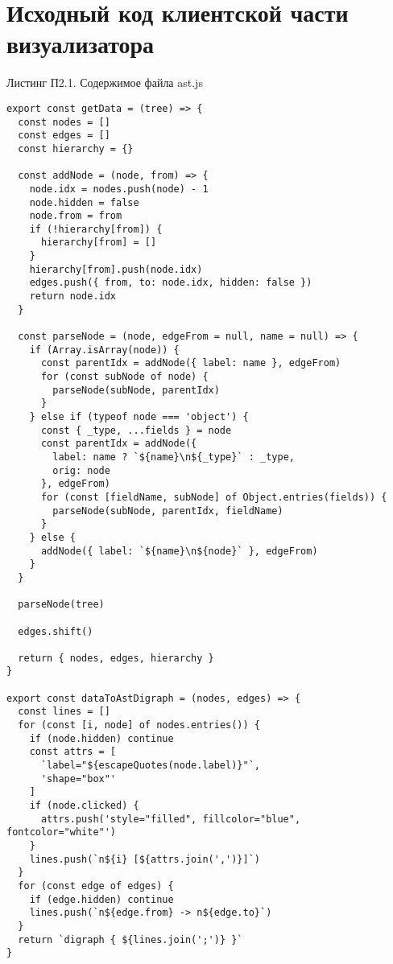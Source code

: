 \chapter{Исходный код клиентской части визуализатора}\label{appendix-MikTeX-TexStudio}							%

\lstset{
frame=single,
numbersep = 5pt,
stepnumber = 1
}

\begin{flushright}
Листинг П2.1. Содержимое файла ast.js
\end{flushright}

\begin{lstlisting}
export const getData = (tree) => {
  const nodes = []
  const edges = []
  const hierarchy = {}

  const addNode = (node, from) => {
    node.idx = nodes.push(node) - 1
    node.hidden = false
    node.from = from
    if (!hierarchy[from]) {
      hierarchy[from] = []
    }
    hierarchy[from].push(node.idx)
    edges.push({ from, to: node.idx, hidden: false })
    return node.idx
  }

  const parseNode = (node, edgeFrom = null, name = null) => {
    if (Array.isArray(node)) {
      const parentIdx = addNode({ label: name }, edgeFrom)
      for (const subNode of node) {
        parseNode(subNode, parentIdx)
      }
    } else if (typeof node === 'object') {
      const { _type, ...fields } = node
      const parentIdx = addNode({
        label: name ? `${name}\n${_type}` : _type,
        orig: node
      }, edgeFrom)
      for (const [fieldName, subNode] of Object.entries(fields)) {
        parseNode(subNode, parentIdx, fieldName)
      }
    } else {
      addNode({ label: `${name}\n${node}` }, edgeFrom)
    }
  }

  parseNode(tree)

  edges.shift()

  return { nodes, edges, hierarchy }
}

export const dataToAstDigraph = (nodes, edges) => {
  const lines = []
  for (const [i, node] of nodes.entries()) {
    if (node.hidden) continue
    const attrs = [
      `label="${escapeQuotes(node.label)}"`,
      'shape="box"'
    ]
    if (node.clicked) {
      attrs.push('style="filled", fillcolor="blue", fontcolor="white"')
    }
    lines.push(`n${i} [${attrs.join(',')}]`)
  }
  for (const edge of edges) {
    if (edge.hidden) continue
    lines.push(`n${edge.from} -> n${edge.to}`)
  }
  return `digraph { ${lines.join(';')} }`
}
\end{lstlisting}

